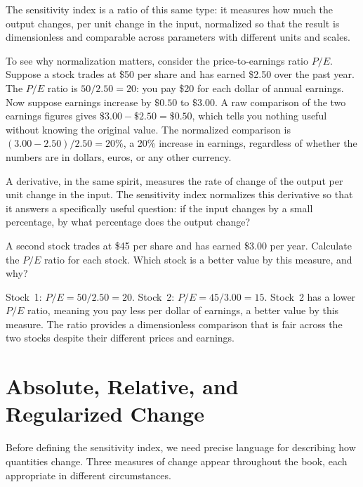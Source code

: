 The sensitivity index is a ratio of this same type: it measures
how much the output changes, per unit change in the input,
normalized so that the result is dimensionless and comparable
across parameters with different units and scales.

To see why normalization matters, consider the price-to-earnings
ratio $P/E$. Suppose a stock trades at \$50 per share and has earned
\$2.50 over the past year. The $P/E$ ratio is $50/2.50 = 20$:
you pay \$20 for each dollar of annual earnings.
Now suppose earnings increase by $\$0.50$ to $\$3.00$.
A raw comparison of the two earnings figures gives $\$3.00 - \$2.50 = \$0.50$,
which tells you nothing useful without knowing the original value.
The normalized comparison is $(3.00 - 2.50)/2.50 = 20\%$, a
20\% increase in earnings, regardless of whether the numbers
are in dollars, euros, or any other currency.

A derivative, in the same spirit, measures the rate of change of
the output per unit change in the input. The sensitivity index
normalizes this derivative so that it answers a
specifically useful question: if the input changes by a small
percentage, by what percentage does the output change?

\begin{selfcheck}
A second stock trades at \$45 per share and has earned \$3.00 per year.
Calculate the $P/E$ ratio for each stock. Which stock is a better
value by this measure, and why?
\end{selfcheck}
\begin{scAnswer}
Stock~1: $P/E = 50/2.50 = 20$. Stock~2: $P/E = 45/3.00 = 15$.
Stock~2 has a lower $P/E$ ratio, meaning you pay less per dollar
of earnings, a better value by this measure.
The ratio provides a dimensionless comparison that is fair across
the two stocks despite their different prices and earnings.
\end{scAnswer}

\section{Absolute, Relative, and Regularized Change}
\label{sec:change}

Before defining the sensitivity index, we need precise language
for describing how quantities change. Three measures of change
appear throughout the book, each appropriate in different circumstances.

